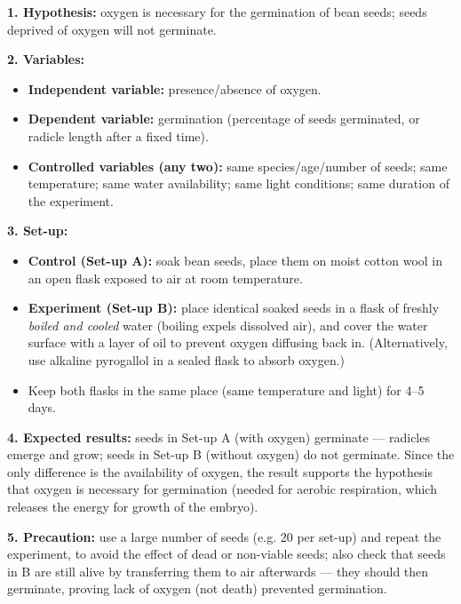 \documentclass[11pt]{article}
\newcounter{popsec}
\newcounter{popsub}
\newcommand{\courssub}[1]{%
  \stepcounter{popsub}%
  \par\vspace{9pt}\noindent{\popxbold\fontsize{11.5}{13}\selectfont\color{popink}{\color{poporange}\thepopsec.\thepopsub}\hspace{6pt}#1}\par\nopagebreak\vspace{4pt}
}
\begin{document}
\begin{corrige}
\textbf{1. Hypothesis:} oxygen is necessary for the germination of bean seeds; seeds deprived of oxygen will not germinate.

\textbf{2. Variables:}
\begin{itemize}
\item \textbf{Independent variable:} presence/absence of oxygen.
\item \textbf{Dependent variable:} germination (percentage of seeds germinated, or radicle length after a fixed time).
\item \textbf{Controlled variables (any two):} same species/age/number of seeds; same temperature; same water availability; same light conditions; same duration of the experiment.
\end{itemize}

\textbf{3. Set-up:}
\begin{itemize}
\item \textbf{Control (Set-up A):} soak bean seeds, place them on moist cotton wool in an open flask exposed to air at room temperature.
\item \textbf{Experiment (Set-up B):} place identical soaked seeds in a flask of freshly \emph{boiled and cooled} water (boiling expels dissolved air), and cover the water surface with a layer of oil to prevent oxygen diffusing back in. (Alternatively, use alkaline pyrogallol in a sealed flask to absorb oxygen.)
\item Keep both flasks in the same place (same temperature and light) for 4–5 days.
\end{itemize}

\textbf{4. Expected results:} seeds in Set-up A (with oxygen) germinate — radicles emerge and grow; seeds in Set-up B (without oxygen) do not germinate. Since the only difference is the availability of oxygen, the result supports the hypothesis that oxygen is necessary for germination (needed for aerobic respiration, which releases the energy for growth of the embryo).

\textbf{5. Precaution:} use a large number of seeds (e.g. 20 per set-up) and repeat the experiment, to avoid the effect of dead or non-viable seeds; also check that seeds in B are still alive by transferring them to air afterwards — they should then germinate, proving lack of oxygen (not death) prevented germination.
\end{corrige}

\courssub{I prepare for the GCE}
\end{document}
